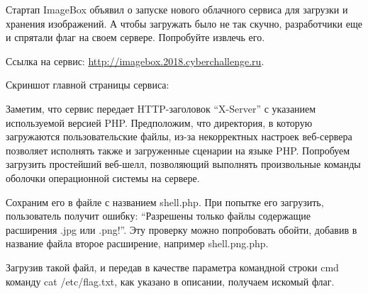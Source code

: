 
Стартап ImageBox объявил о запуске нового облачного сервиса для загрузки и хранения изображений. А чтобы загружать было не так скучно, разработчики еще и спрятали флаг на своем сервере. Попробуйте извлечь его.

Ссылка на сервис: \url{http://imagebox.2018.cyberchallenge.ru}.

\solutionSection

Скриншот главной страницы сервиса:


Заметим, что сервис передает HTTP-заголовок “X-Server” с указанием используемой версией PHP. Предположим, что директория, в которую загружаются пользовательские файлы, из-за некорректных настроек веб-сервера позволяет исполнять также и загруженные сценарии на языке PHP. Попробуем загрузить простейший веб-шелл, позволяющий выполнять произвольные команды оболочки операционной системы на сервере.


Сохраним его в файле с названием shell.php. При попытке его загрузить, пользователь получит ошибку: “Разрешены только файлы содержащие расширения .jpg или .png!”.  Эту проверку можно попробовать обойти, добавив в название файла второе расширение, например shell.png.php.

Загрузив такой файл, и передав в качестве параметра командной строки cmd команду cat /etc/flag.txt, как указано в описании, получаем искомый флаг.



